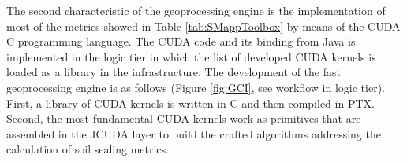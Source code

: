 \documentclass[APA,LATO1COL,doublespace]{WileyNJD-v2}
\newcommand{\toberevised}[1]{\emph{\textcolor{red}{#1}}} %
\begin{document}
The second characteristic of the geoprocessing engine is the implementation of most of the metrics showed in Table \ref{tab:SMappToolbox} by means of the CUDA C programming language.
The CUDA code and its binding from Java is implemented in the logic tier in which %
the list of developed CUDA kernels is loaded as a library in the infrastructure.
The development of the fast geoprocessing engine is as follows (Figure \ref{fig:GCI}, see workflow in logic tier).
First, a library of CUDA kernels is written in C and then compiled in PTX. 
Second, the most fundamental CUDA kernels work as primitives that are assembled in the JCUDA layer to build the crafted algorithms  addressing the calculation of soil sealing metrics.
\end{document}
